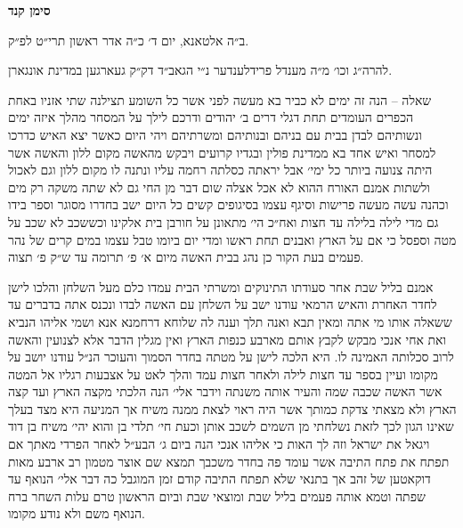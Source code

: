 \documentclass[12pt, openany]{book}
\newcommand{\chapname}{}
\newcommand{\newchap}[1]{
	\addcontentsline{toc}{chapter}{#1}
	\renewcommand{\chapname}{#1}
		\begin{center}
			\textbf{%
\fontsize{16pt}{16pt}\selectfont
				#1}
		\end{center}
}
\begin{document}
\begin{multicols}{2}
\end{multicols}\newpage

\newchap{סימן קנד}
\begin{multicols}{2}
ב״ה אלטאנא, יום ד׳ כ״ה אדר ראשון תרי״ט לפ״ק.\\\vspace{0pt}

להרה״ג וכו׳ מ״ה מענדל פרידלענדער נ״י הגאב״ד דק״ק געארגען במדינת אונגארן.\\\vspace{0pt}

שאלה – הנה זה ימים לא כביר בא מעשה לפני אשר כל השומע תצילנה שתי אזניו באחת הכפרים העומדים תחת דגלי דרים ב׳ יהודים ודרכם לילך על המסחר מהלך איזה ימים ונשותיהם לבדן בבית עם בניהם ובנותיהם ומשרתיהם ויהי היום כאשר יצא האיש כדרכו למסחר ואיש אחד בא ממדינת פולין ובגדיו קרועים ויבקש מהאשה מקום ללון והאשה אשר היתה צנועה ביותר כל ימי׳ אבל יראתה כסלתה רחמה עליו ונתנה לו מקום ללון וגם לאכול ולשתות אמנם האורח ההוא לא אכל אצלה שום דבר מן החי גם לא שתה משקה רק מים וכהנה עשה מעשה פרישות וסיגף עצמו בסיגופים קשים כל היום ישב בחדרו מסוגר וספר בידו גם מדי לילה בלילה עד חצות ואח״כ הי׳ מתאונן על חורבן בית אלקינו וכששכב לא שכב על מטה וספסל כי אם על הארץ ואבנים תחת ראשו ומדי יום ביומו טבל עצמו במים קרים של נהר פעמים בעת הקור כן נהג בבית האשה מיום א׳ פ׳ תרומה עד ש״ק פ׳ תצוה. \\\vspace{0pt}

אמנם בליל שבת אחר סעודתו התינוקים ומשרתי הבית עמדו כלם מעל השלחן והלכו לישן לחדר האחרת והאיש הרמאי עודנו ישב על השלחן עם האשה לבדו ונכנס אתה בדברים עד ששאלה אותו מי אתה ומאין תבא ואנה תלך וענה לה שלוחא דרחמנא אנא ושמי אליהו הנביא ואת אחי אנכי מבקש לקבץ אותם מארבע כנפות הארץ ואין מגלין הדבר אלא לצנועין והאשה לרוב סכלותה האמינה לו. היא הלכה לישן על מטתה בחדר הסמוך והעוכר הנ״ל עודנו יושב על מקומו ועיין בספר עד חצות לילה ולאחר חצות עמד והלך לאט על אצבעות רגליו אל המטה אשר האשה שכבה שמה והעיר אותה משנתה וידבר אלי׳ הנה הלכתי מקצה הארץ ועד קצה הארץ ולא מצאתי צדקת כמותך אשר היה ראוי לצאת ממנה משיח אך המניעה היא מצד בעלך שאינו הגון לכך לזאת נשלחתי מן השמים לשכב אותן וכעת חי׳ תלדי בן והוא יהי׳ משיח בן דוד ויגאל את ישראל וזה לך האות כי אליהו אנכי הנה ביום ג׳ הבע״ל לאחר הפרדי מאתך אם תפתח את פתח התיבה אשר עומד פה בחדר משכבך תמצא שם אוצר מטמון רב ארבע מאות דוקאטען של זהב אך בתנאי שלא תפתח התיבה קודם זמן המוגבל כה דבר אלי׳ הנואף עד שפתה וטמא אותה פעמים בליל שבת ומוצאי שבת וביום הראשון טרם עלות השחר ברח הנואף משם ולא נודע מקומו. \\\vspace{0pt}


\end{multicols}
\end{document}
